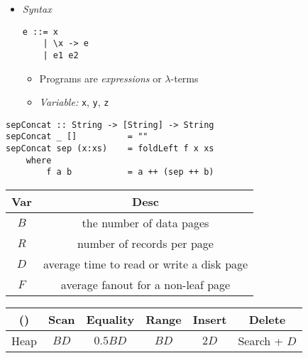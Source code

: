 \documentclass[landscape,8pt]{extarticle}
\newcommand{\code}{\lstinline}
\begin{document}
\footnotesize
\begin{multicols}{4}
    \setlength{\premulticols}{1pt}
    \setlength{\postmulticols}{1pt}
    \setlength{\multicolsep}{1pt}
    \setlength{\columnsep}{2pt}
    \begin{itemize}
        \item \emph{Syntax}
        \begin{lstlisting}
e ::= x
    | \x -> e
    | e1 e2
        \end{lstlisting}
        \begin{itemize}
            \item Programs are \emph{expressions} or $\lambda$-terms
            \item \emph{Variable:} \code{x}, \code{y}, \code{z}
        \end{itemize}
    \end{itemize}
    \begin{lstlisting}
sepConcat :: String -> [String] -> String
sepConcat _ []          = ""
sepConcat sep (x:xs)    = foldLeft f x xs
    where
        f a b           = a ++ (sep ++ b)
    \end{lstlisting}
    \begin{center}
        \begin{tabular}{ | c | c | } \toprule
            Var     & Desc                                      \\ \midrule
            $B$     & the number of data pages                  \\ \midrule
            $R$     & number of records per page                \\ \midrule
            $D$     & average time to read or write a disk page \\ \midrule
            $F$     & average fanout for a non-leaf page        \\ \bottomrule
        \end{tabular}
    \end{center}
    \begin{center}
        \begin{adjustbox}{angle=270}
            \begin{tabular}{ | c | c | c | c | c | c | } \toprule
                ()            & Scan          & Equality              & Range                                    & Insert        & Delete        \\ \midrule
                Heap          & $BD$          & $0.5 BD$              & $BD$                                     & $2D$          & Search + $D$  \\ \midrule

\end{tabular}
\end{adjustbox}
\end{center}
\end{multicols}
\end{document}
